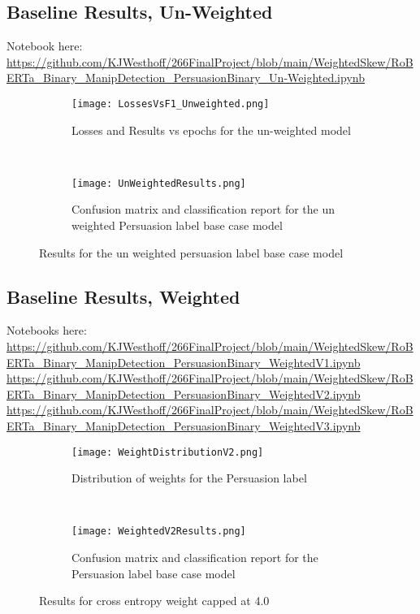 \documentclass[
	letterpaper, %
	12pt, %
	unnumberedsections, %
	twoside, %
]{LTJournalArticle}
\begin{document}
\begin{appendices}
	\subsection{Baseline Results, Un-Weighted}\label{appendix:UnWeightedResults}
	Notebook here:
	\url{https://github.com/KJWesthoff/266FinalProject/blob/main/WeightedSkew/RoBERTa_Binary_ManipDetection_PersuasionBinary_Un-Weighted.ipynb}



	\begin{figure*}[t!]
		\centering
		\begin{subfigure}[t]{0.5\textwidth}
			\centering
			\texttt{[image: LossesVsF1\_Unweighted.png]}
			\caption{Losses and Results vs epochs for the un-weighted model}
			\label{fig:UnWeightedEpochPlot}
		\end{subfigure}%
		~
		\begin{subfigure}[t]{0.4\textwidth}
			\texttt{[image: UnWeightedResults.png]}
			\caption{Confusion matrix and classification report for the un weighted Persuasion label base case model}
			\label{fig:UNWeightedResults}
			\centering
		\end{subfigure}
		\caption{Results for the un weighted persuasion label base case model}
	\end{figure*}











	\subsection{Baseline Results, Weighted}\label{appendix:WeightedResults}
	Notebooks here:
	\url{https://github.com/KJWesthoff/266FinalProject/blob/main/WeightedSkew/RoBERTa_Binary_ManipDetection_PersuasionBinary_WeightedV1.ipynb}
	\url{https://github.com/KJWesthoff/266FinalProject/blob/main/WeightedSkew/RoBERTa_Binary_ManipDetection_PersuasionBinary_WeightedV2.ipynb}
	\url{https://github.com/KJWesthoff/266FinalProject/blob/main/WeightedSkew/RoBERTa_Binary_ManipDetection_PersuasionBinary_WeightedV3.ipynb}


	\begin{figure*}[t!]
		\centering
		\begin{subfigure}[t]{0.5\textwidth}
			\centering
			\texttt{[image: WeightDistributionV2.png]}
			\caption{Distribution of weights for the Persuasion label}
			\label{fig:V2WeightDistribution}
		\end{subfigure}%
		~
		\begin{subfigure}[t]{0.5\textwidth}
			\texttt{[image: WeightedV2Results.png]}
			\caption{Confusion matrix and classification report for the Persuasion label base case model}
			\label{fig:V2Results}
			\centering
		\end{subfigure}
		\caption{Results for cross entropy weight capped at 4.0}
	\end{figure*}


\end{appendices}
\end{document}
